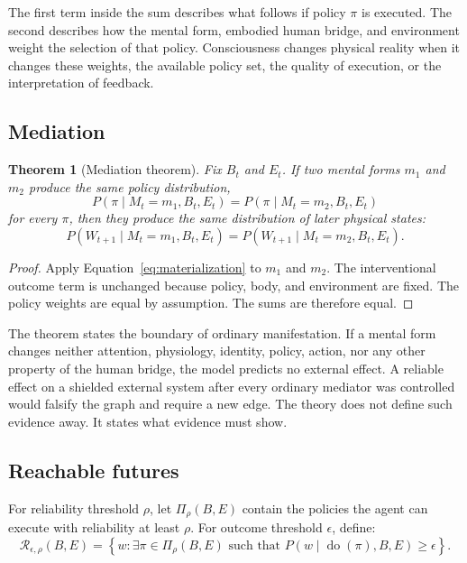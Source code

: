 \documentclass[11pt]{article}
\theoremstyle{plain}
\newtheorem{theorem}{Theorem}[section]
\theoremstyle{definition}
\newcommand{\Aset}{\mathcal{R}}
\newcommand{\Pset}{\Pi}
\newcommand{\doop}{\operatorname{do}}
\begin{document}
The first term inside the sum describes what follows if policy \(\pi\) is executed.
The second describes how the mental form, embodied human bridge, and environment
weight the selection of that policy. Consciousness changes physical reality when it
changes these weights, the available policy set, the quality of execution, or the
interpretation of feedback.

\subsection*{Mediation}

\begin{theorem}[Mediation theorem]
Fix \(B_t\) and \(E_t\). If two mental forms \(m_1\) and \(m_2\) produce the same
policy distribution,
\[
P(\pi\mid M_t=m_1,B_t,E_t)=P(\pi\mid M_t=m_2,B_t,E_t)
\]
for every \(\pi\), then they produce the same distribution of later physical states:
\[
P(W_{t+1}\mid M_t=m_1,B_t,E_t)
=
P(W_{t+1}\mid M_t=m_2,B_t,E_t).
\]
\end{theorem}

\begin{proof}
Apply Equation~\ref{eq:materialization} to \(m_1\) and \(m_2\). The interventional
outcome term is unchanged because policy, body, and environment are fixed. The policy
weights are equal by assumption. The sums are therefore equal.
\end{proof}

The theorem states the boundary of ordinary manifestation. If a mental form changes
neither attention, physiology, identity, policy, action, nor any other property of the
human bridge, the model predicts no external effect. A reliable effect on a shielded
external system after every ordinary mediator was controlled would falsify the graph
and require a new edge. The theory does not define such evidence away. It states what
evidence must show.

\subsection*{Reachable futures}

For reliability threshold \(\rho\), let \(\Pset_\rho(B,E)\) contain the policies the
agent can execute with reliability at least \(\rho\). For outcome threshold
\(\epsilon\), define:
\begin{equation}
\Aset_{\epsilon,\rho}(B,E)
=
\left\{
w:\exists\pi\in\Pset_\rho(B,E)
\text{ such that }
P\!\left(w\mid\doop(\pi),B,E\right)\ge\epsilon
\right\}.
\label{eq:reachable}
\end{equation}
\end{document}
